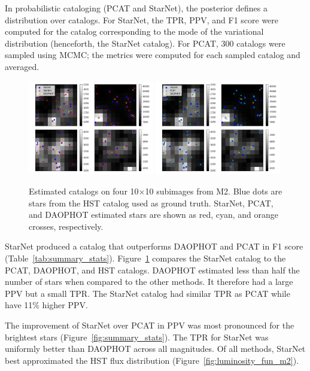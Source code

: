In probabilistic cataloging (PCAT and StarNet), the posterior defines a distribution over catalogs.
For StarNet, the TPR, PPV, and F1 score were computed for the catalog corresponding to the mode of the variational distribution (henceforth, the StarNet catalog).
For PCAT, 300 catalogs were sampled using MCMC; the metrics were computed for each sampled catalog and averaged.

\begin{figure}[tb]
    \centering
    \includegraphics[width=0.49\textwidth]{figures/m2_results/example_subimages_starnet.png}
    \includegraphics[width=0.49\textwidth]{figures/m2_results/example_subimages_pcat.png}
    \caption{Estimated catalogs on four 10$\times$10 subimages from
    M2. Blue dots are stars from the HST catalog used as ground truth.
    StarNet, PCAT, and DAOPHOT estimated stars are shown as
    red, cyan, and orange crosses, respectively. }
    \label{fig:example_subimages}
\end{figure}

StarNet produced a catalog that outperforms DAOPHOT and PCAT in F1 score (Table~\ref{tab:summary_stats}).
Figure~\ref{fig:example_subimages} compares the StarNet catalog to the PCAT, DAOPHOT, and HST catalogs.
DAOPHOT estimated less than half the number of stars when compared to the other methods.
It therefore had a large PPV but a small TPR.
The StarNet catalog had similar TPR as PCAT while have 11\% higher PPV.

The improvement of StarNet over PCAT in PPV was most pronounced for the brightest stars (Figure~\ref{fig:summary_stats}).
The TPR for StarNet was uniformly better than DAOPHOT across all magnitudes.
Of all methods, StarNet best approximated the HST flux distribution (Figure~\ref{fig:luminosity_fun_m2}).

